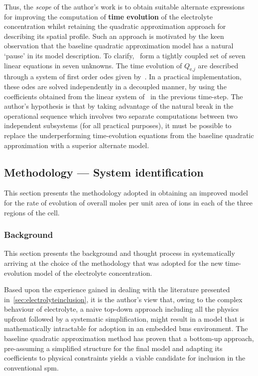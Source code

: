 Thus,   the  \emph{scope}   of  the   author's  work   is  to   obtain  suitable
alternate   expressions   for   improving  the   computation   of   \textbf{time
evolution}  of  the electrolyte  concentration  whilst  retaining the  quadratic
approximation   approach   for  describing   its   spatial   profile.  Such   an
approach  is motivated  by  the  keen observation  that  the baseline  quadratic
approximation  model  has  a  natural  `pause'  in  its  model  description.  To
clarify,~  form a  tightly
coupled set of  seven linear equations in seven unknowns.  The time evolution of
$Q_{\text{e,}j}$  are described  through  a system  of  first order  \glspl{ode}
given by~.  In a
practical  implementation,  these  \glspl{ode}  are solved  independently  in  a
decoupled  manner,\ie{}  by using  the  coefficients  obtained from  the  linear
system of~ in the previous
time-step. The  author's hypothesis is that  by taking advantage of  the natural
break  in the  operational  sequence which  involves  two separate  computations
between  two independent  subsystems (for  all practical  purposes), it  must be
possible  to  replace  the  underperforming time-evolution  equations  from  the
baseline quadratic approximation with a superior alternate model.

\subsection{Methodology --- System identification} %

This section presents the methodology adopted in obtaining an improved model for
the rate of evolution  of overall moles per unit area of   ions in each
of the three regions of the cell.

\subsubsection*{Background}\label{subsubsec:sysidbackground}

This  section presents  the  background and  thought  process in  systematically
arriving  at  the  choice of  the  methodology  that  was  adopted for  the  new
time-evolution model of the electrolyte concentration.

Based  upon the  experience  gained  in dealing  with  the literature  presented
in~\cref{sec:electrolyteinclusion}, it is  the author's view that,  owing to the
complex behaviour of electrolyte, a  naive top-down approach \ie{} including all
the physics upfront  followed by a systematic simplification, might  result in a
model that is  mathematically intractable for adoption in  an embedded \gls{bms}
environment.  The baseline  quadratic  approximation method  has  proven that  a
bottom-up  approach, \ie{}  pre-assuming a  simplified structure  for the  final
model  and adapting  its coefficients  to physical  constraints yields  a viable
candidate for inclusion in the conventional \gls{spm}.


